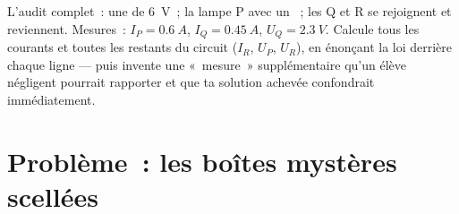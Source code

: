 \begin{exercise}[$\star\star\star$]\label{exo:g8:circuit-laws:12}
L'audit complet~: une  de \qty{6}{V}~; la lampe P  avec
un ~; les  Q et R se rejoignent et reviennent. Mesures~:
$I_P = \qty{0.6}{A}$, $I_Q = \qty{0.45}{A}$, $U_Q = \qty{2.3}{V}$.
Calcule tous les courants et toutes les  restants du circuit
($I_R$, $U_P$, $U_R$), en énonçant la loi derrière chaque ligne ---
puis invente une «~mesure~» supplémentaire qu'un élève négligent
pourrait rapporter et que ta solution achevée confondrait
immédiatement.
\end{exercise}

\section{Problème~: les boîtes mystères scellées}

